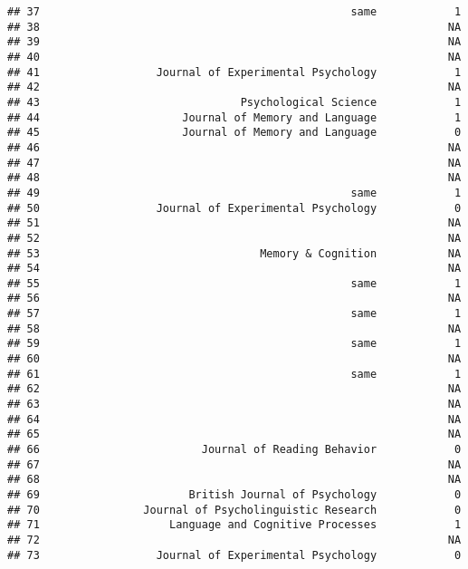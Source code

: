 \documentclass[
  english,
  man]{apa6}
\begin{document}
\begin{verbatim}
## 37                                                same            1
## 38                                                               NA
## 39                                                               NA
## 40                                                               NA
## 41                  Journal of Experimental Psychology            1
## 42                                                               NA
## 43                               Psychological Science            1
## 44                      Journal of Memory and Language            1
## 45                      Journal of Memory and Language            0
## 46                                                               NA
## 47                                                               NA
## 48                                                               NA
## 49                                                same            1
## 50                  Journal of Experimental Psychology            0
## 51                                                               NA
## 52                                                               NA
## 53                                  Memory & Cognition           NA
## 54                                                               NA
## 55                                                same            1
## 56                                                               NA
## 57                                                same            1
## 58                                                               NA
## 59                                                same            1
## 60                                                               NA
## 61                                                same            1
## 62                                                               NA
## 63                                                               NA
## 64                                                               NA
## 65                                                               NA
## 66                         Journal of Reading Behavior            0
## 67                                                               NA
## 68                                                               NA
## 69                       British Journal of Psychology            0
## 70                Journal of Psycholinguistic Research            0
## 71                    Language and Cognitive Processes            1
## 72                                                               NA
## 73                  Journal of Experimental Psychology            0

\end{verbatim}
\end{document}
